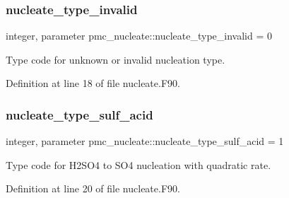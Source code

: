 \mbox{\label{namespacepmc__nucleate_a9b3294f7b14e77755d00cdf9083befe5}} 
\subsubsection{\texorpdfstring{nucleate\+\_\+type\+\_\+invalid}{nucleate\_type\_invalid}}
{\footnotesize\ttfamily integer, parameter pmc\+\_\+nucleate\+::nucleate\+\_\+type\+\_\+invalid = 0}



Type code for unknown or invalid nucleation type. 



Definition at line 18 of file nucleate.\+F90.

\mbox{\label{namespacepmc__nucleate_a0bc83e4138421dbce4f88810145e181b}} 
\subsubsection{\texorpdfstring{nucleate\+\_\+type\+\_\+sulf\+\_\+acid}{nucleate\_type\_sulf\_acid}}
{\footnotesize\ttfamily integer, parameter pmc\+\_\+nucleate\+::nucleate\+\_\+type\+\_\+sulf\+\_\+acid = 1}



Type code for H2\+S\+O4 to S\+O4 nucleation with quadratic rate. 



Definition at line 20 of file nucleate.\+F90.

